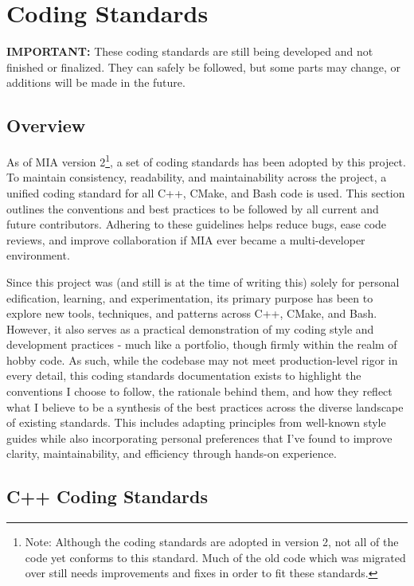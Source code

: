 \chapter{Coding Standards}

\textbf{IMPORTANT:} These coding standards are still being developed and not finished or finalized. They can safely be followed, but some parts may change, or additions will be made in the future.

\section{Overview}

As of MIA version 2\footnote{Note: Although the coding standards are adopted in version 2, not all of the code yet conforms to this standard. Much of the old code which was migrated over still needs improvements and fixes in order to fit these standards.}, a set of coding standards has been adopted by this project. To maintain consistency, readability, and maintainability across the project, a unified coding standard for all C++, CMake, and Bash code is used. This section outlines the conventions and best practices to be followed by all current and future contributors. Adhering to these guidelines helps reduce bugs, ease code reviews, and improve collaboration if MIA ever became a multi-developer environment.

Since this project was (and still is at the time of writing this) solely for personal edification, learning, and experimentation, its primary purpose has been to explore new tools, techniques, and patterns across C++, CMake, and Bash. However, it also serves as a practical demonstration of my coding style and development practices - much like a portfolio, though firmly within the realm of hobby code. As such, while the codebase may not meet production-level rigor in every detail, this coding standards documentation exists to highlight the conventions I choose to follow, the rationale behind them, and how they reflect what I believe to be a synthesis of the best practices across the diverse landscape of existing standards. This includes adapting principles from well-known style guides while also incorporating personal preferences that I’ve found to improve clarity, maintainability, and efficiency through hands-on experience.

\section{C++ Coding Standards}

